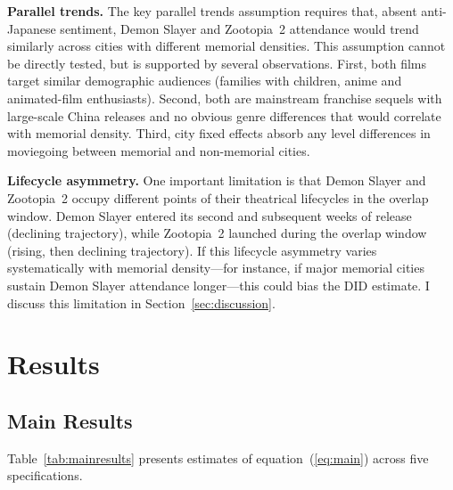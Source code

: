 \documentclass[12pt]{article}
\begin{document}
\textbf{Parallel trends.} The key parallel trends assumption requires that, absent anti-Japanese sentiment, Demon Slayer and Zootopia~2 attendance would trend similarly across cities with different memorial densities. This assumption cannot be directly tested, but is supported by several observations. First, both films target similar demographic audiences (families with children, anime and animated-film enthusiasts). Second, both are mainstream franchise sequels with large-scale China releases and no obvious genre differences that would correlate with memorial density. Third, city fixed effects absorb any level differences in moviegoing between memorial and non-memorial cities.

\textbf{Lifecycle asymmetry.} One important limitation is that Demon Slayer and Zootopia~2 occupy different points of their theatrical lifecycles in the overlap window. Demon Slayer entered its second and subsequent weeks of release (declining trajectory), while Zootopia~2 launched during the overlap window (rising, then declining trajectory). If this lifecycle asymmetry varies systematically with memorial density---for instance, if major memorial cities sustain Demon Slayer attendance longer---this could bias the DID estimate. I discuss this limitation in Section~\ref{sec:discussion}.

\section{Results}

\subsection{Main Results}

Table~\ref{tab:mainresults} presents estimates of equation~(\ref{eq:main}) across five specifications.
\end{document}
